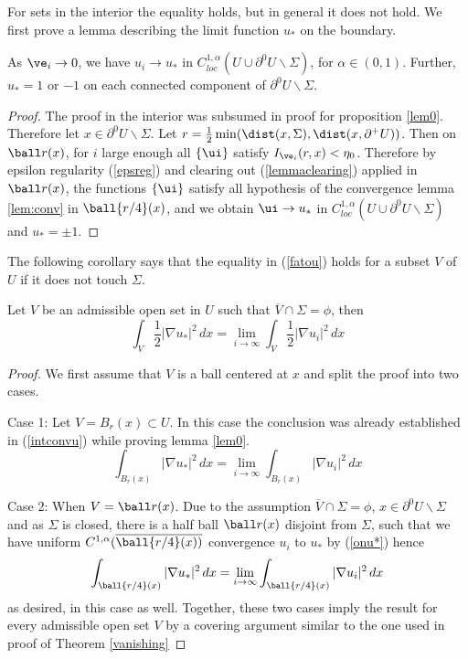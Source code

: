 For sets in the interior the equality holds, but in general it does not hold. We first prove a lemma describing the limit function $u_*$ on the boundary. 

\begin{prop} \label{onu*}
    As $\ve_i \to 0$, we have $u_i \to u_*$ in $C^{1,\alpha}_{loc}(U\cup \partial^0U \backslash \Sigma)$, for $\alpha \in (0,1)$. Further, $u_*=1$ or $-1$ on each connected component of $\partial^0U \backslash \Sigma$.
\end{prop}
\begin{proof}
    The proof in the interior was subsumed in proof for proposition \ref{lem0}. Therefore let $x \in \partial^0U \backslash \Sigma$. Let $r = \frac{1}{2} \min(\dist(x,\Sigma),\dist(x,\partial^+U))$. Then on $\ball r (x)$, for $i$ large enough all $\{\ui\}$ satisfy $I_{\ve_i}(r,x) < \eta_0$. Therefore by epsilon regularity (\ref{epsreg}) and clearing out (\ref{lemmaclearing}) applied in $\ball r (x)$, the functions $\{\ui\}$ satisfy all hypothesis of the convergence lemma \ref{lem:conv} in $\ball {r/4}(x) $, and we obtain $\ui \to u_*$ in $C^{1,\alpha}_{loc}(U\cup \partial^0U \backslash \Sigma)$ and $u_*=\pm 1$.  
\end{proof}

The following corollary says that the equality in (\ref{fatou}) holds for a subset $V$ of
$U$ if it does not touch $\Sigma$. 

\begin{coro} \label{propfatou}
    Let $V$ be an admissible open set in $U$ such that $\overline{V} \cap \Sigma = \phi$, then 
    $$\int_V \frac{1}{2}|\nabla u_*|^2 \,dx = \lim_{i \to \infty} \int_V \frac{1}{2}|\nabla u_i|^2 \,dx  $$
\end{coro}
\begin{proof}
   We first assume that $V$ is a ball centered at $x$ and split the proof into two cases.
   
   Case 1: Let $V = B_r(x) \subset U$. In this case the conclusion was already established in (\ref{intconvu}) while proving lemma \ref{lem0}.$$
    \int_{B_r(x)} |\nabla u_*|^2 \,dx = \lim_{i \to \infty} \int_{B_r(x)} |\nabla u_i|^2 \,dx $$
   
   Case 2: When $V = \ball r (x)$. Due to the assumption $\overline{V} \cap \Sigma = \phi $, $x \in   \partial^0U \backslash \Sigma $ and as $\Sigma$ is closed, there is a half ball $\ball r (x)$ disjoint from $\Sigma$, such that we have uniform $C^{1,\alpha}(\overline{\ball {r/4}(x))}$ convergence $u_i$ to $u_*$ by (\ref{onu*}) hence $$\int_{\ball {r/4}(x)} |\nabla u_*|^2\,dx = \lim_{i \to \infty} \int_{\ball {r/4}(x)} |\nabla u_i|^2\,dx $$
   as desired, in this case as well. 
   Together, these two cases imply the result for every admissible open set $V$ by a covering argument similar to the one used in proof of Theorem \ref{vanishing}
\end{proof}

